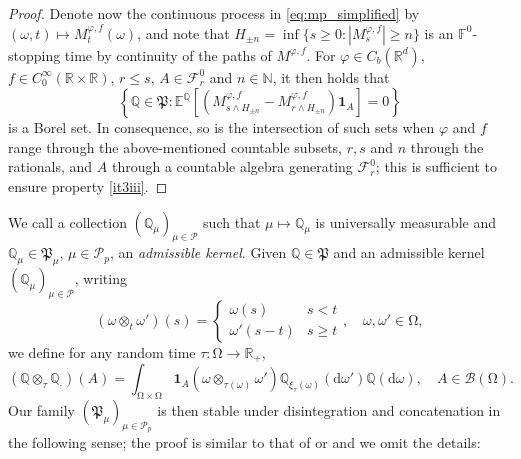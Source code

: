 \documentclass{article}
\theoremstyle{definition}
\numberwithin{equation}{section}
\numberwithin{theorem}{section}
\newcommand{\E}{\mathbb{E}}
\newcommand{\Pp}{\mathbb{Q}}
\newcommand{\di}{\mathrm{d}}
\newcommand{\R}{\mathbb{R}}
\newcommand{\Fc}{\mathcal{F}}
\newcommand{\ind}{\boldsymbol{1}}
\newcommand{\Pc}{\mathcal{P}}
\newcommand{\Bc}{\mathcal{B}}
\newcommand{\Pk}{\mathfrak{P}}
\begin{document}
\begin{appendix}
\begin{proof}
		Denote now the continuous process in \eqref{eq:mp_simplified} by $(\omega,t)\mapsto M^{\varphi,f}_{t}(\omega)$, and note that $H_{\pm n} = \inf \{ s \ge 0 : |M^{\varphi,f}_s| \ge n\}$ is an $\mathbb{F}^0$-stopping time by continuity of the paths of $M^{\varphi,f}$. For $\varphi\in C_b(\R^d)$, $f\in C^\infty_0(\R\times\R)$, $r\le s$, $A\in\Fc^0_r$ and $n\in\mathbb{N}$, it then holds that
		\begin{equation*}
			\left\{\Pp\in\Pk: \E^\Pp\left[\left(M^{\varphi,f}_{s \wedge H_{\pm n}}-M^{\varphi,f}_{r \wedge H_{\pm n}}\right)\bm 1_A\right]=0\right\}
		\end{equation*}
		is a Borel set. 
		In consequence, so is the intersection of such sets when $\varphi$ and $f$ range through the above-mentioned countable subsets, $r,s$ and $n$ through the rationals, and $A$ through a countable algebra generating $\Fc^0_r$; this is sufficient to ensure property \ref{it3iii}. 	
		\end{proof}



	We call a collection $(\Pp_\mu)_{\mu\in\Pc}$ such that $\mu\mapsto\Pp_\mu$ is universally measurable and $\Pp_\mu\in\Pk_\mu$, $\mu\in\Pc_p$, an \emph{admissible kernel}. Given $\Pp\in\Pk$ and an admissible kernel $(\Pp_\mu)_{\mu\in\Pc}$, writing
	\begin{equation*}
		(\omega\otimes_t\omega')(s)=
		\left\{\begin{array}{ll}
		\omega(s) &s<t\\
		\omega'(s-t) &s\ge t
		\end{array}\right.,
		\quad \omega,\omega'\in{\mathrm{\Omega}}, %
	\end{equation*}
	we define for any random time $\tau:{\mathrm{\Omega}}\to\R_+$,
	\begin{equation*}
		(\Pp\otimes_\tau\Pp_\cdot)(A)
		=
		\int_{{\mathrm{\Omega}}\times{\mathrm{\Omega}}} \bm 1_A\left(\omega\otimes_{\tau(\omega)}\omega'\right)\Pp_{\xi_{\tau}(\omega)}(\di\omega')\Pp(\di\omega),
		\quad A\in\Bc({\mathrm{\Omega}}).
	\end{equation*}
	Our family $(\Pk_\mu)_{\mu\in\Pc_p}$ is then stable under disintegration and concatenation in the following sense; the proof is similar to that of \cite[Lemma~3.3]{karoui2013_2} or \cite[Proposition~2.5]{zitkovic2014} and we omit the details: 
	

\end{appendix}
\end{document}
